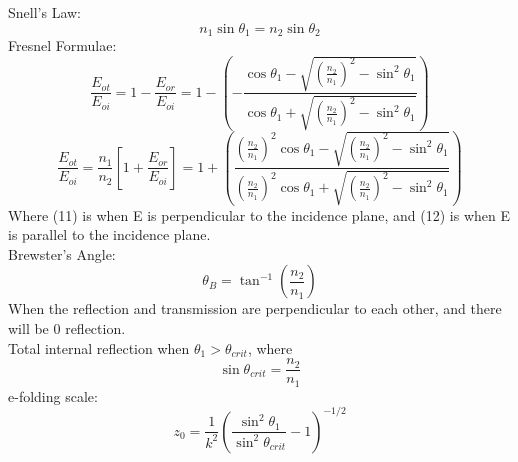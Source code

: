 \documentclass[12pt]{article}
\begin{document}
Snell's Law:
\[n_1\sin\theta_1=n_2\sin\theta_2\]
Fresnel Formulae:
\begin{equation}
    \frac{E_{ot}}{E_{oi}}=1-\frac{E_{or}}{E_{oi}}=1-\left( -\frac{\cos\theta_1-\sqrt{\left(\frac{n_2}{n_1}\right)^2-\sin^2\theta_1}}{\cos\theta_1+\sqrt{\left(\frac{n_2}{n_1}\right)^2-\sin^2\theta_1}}  \right)
\end{equation}
\begin{equation}
    \frac{E_{ot}}{E_{oi}}=\frac{n_1}{n_2}\left[1+\frac{E_{or}}{E_{oi}}\right]=1+\left( \frac{\left(\frac{n_2}{n_1}\right)^2\cos\theta_1-\sqrt{\left(\frac{n_2}{n_1}\right)^2-\sin^2\theta_1}}{\left(\frac{n_2}{n_1}\right)^2\cos\theta_1+\sqrt{\left(\frac{n_2}{n_1}\right)^2-\sin^2\theta_1}}  \right)
\end{equation}
Where (11) is when E is perpendicular to the incidence plane, and (12) is when E is parallel to the incidence plane.\\
Brewster's Angle:
\[\theta_B=\tan^{-1}\left( \frac{n_2}{n_1}\right)\]
When the reflection and transmission are perpendicular to each other, and there will be 0 reflection. 
\\ Total internal reflection when $\theta_1>\theta_{crit}$, where
\[\sin\theta_{crit}=\frac{n_2}{n_1}\]
e-folding scale:
\[z_0=\frac{1}{k^2}\left( \frac{\sin^2\theta_1}{\sin^2\theta_{crit}} -1 \right)^{-1/2}\]
\end{document}
